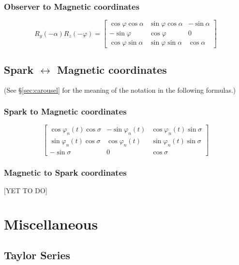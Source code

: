 \documentclass{book}
\newcommand{\phase}{\varphi}
\begin{document}
\subsection{Observer to Magnetic coordinates}
\begin{equation}
    R_y(-\alpha) R_z(-\phase) =
    \begin{bmatrix}
        \cos\phase\cos\alpha & \sin\phase\cos\alpha & -\sin\alpha \\
        -\sin\phase          & \cos\phase           & 0           \\
        \cos\phase\sin\alpha & \sin\phase\sin\alpha &  \cos\alpha
    \end{bmatrix}
\end{equation}

\section{Spark $\leftrightarrow$ Magnetic coordinates}

(See \S\ref{sec:carousel} for the meaning of the notation in the following formulas.)

\subsection{Spark to Magnetic coordinates}
\begin{equation}
    \begin{bmatrix}
        \cos\phase_n(t)\cos\sigma & -\sin\phase_n(t) & \cos\phase_n(t)\sin\sigma \\
        \sin\phase_n(t)\cos\sigma &  \cos\phase_n(t) & \sin\phase_n(t)\sin\sigma \\
        -\sin\sigma          & 0           & \cos\sigma
    \end{bmatrix}
\end{equation}

\subsection{Magnetic to Spark coordinates}

[YET TO DO]

\chapter{Miscellaneous}

\section{Taylor Series}
\end{document}
